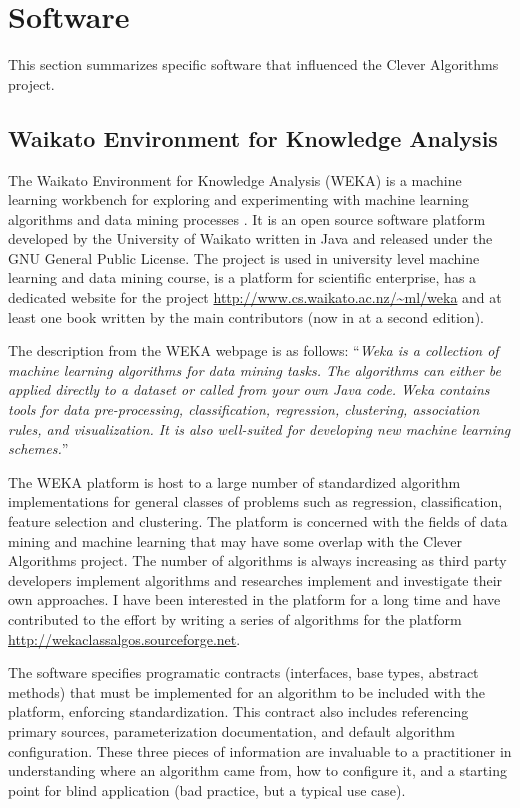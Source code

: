 \documentclass[a4paper, 11pt]{article}
\begin{document}
% 
% 
\section{Software}
\label{sec:software}
This section summarizes specific software that influenced the Clever Algorithms project.

% 
% 
\subsection{Waikato Environment for Knowledge Analysis}
The Waikato Environment for Knowledge Analysis (WEKA) is a machine learning workbench for exploring and experimenting with machine learning algorithms and data mining processes \cite{Hall2009}. It is an open source software platform developed by the University of Waikato written in Java and released under the GNU General Public License. The project is used in university level machine learning and data mining course, is a platform for scientific enterprise, has a dedicated website for the project \url{http://www.cs.waikato.ac.nz/~ml/weka} and at least one book written by the main contributors \cite{Witten2000} (now in at a second edition).

The description from the WEKA webpage is as follows: ``\emph{Weka is a collection of machine learning algorithms for data mining tasks. The algorithms can either be applied directly to a dataset or called from your own Java code. Weka contains tools for data pre-processing, classification, regression, clustering, association rules, and visualization. It is also well-suited for developing new machine learning schemes.}''

The WEKA platform is host to a large number of standardized algorithm implementations for general classes of problems such as regression, classification, feature selection and clustering. The platform is concerned with the fields of data mining and machine learning that may have some overlap with the Clever Algorithms project. The number of algorithms is always increasing as third party developers implement algorithms and researches implement and investigate their own approaches. I have been interested in the platform for a long time and have contributed to the effort by writing a series of algorithms for the platform \url{http://wekaclassalgos.sourceforge.net}. 

The software specifies programatic contracts (interfaces, base types, abstract methods) that must be implemented for an algorithm to be included with the platform, enforcing standardization. This contract also includes referencing primary sources, parameterization documentation, and default algorithm configuration. These three pieces of information are invaluable to a practitioner in understanding where an algorithm came from, how to configure it, and a starting point for blind application (bad practice, but a typical use case).
\end{document}
